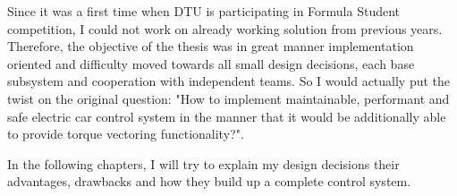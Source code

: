 Since it was a first time when DTU is participating in Formula Student competition, I could not work on already working solution from previous years.
Therefore, the objective of the thesis was in great manner implementation oriented and difficulty moved towards all small design decisions, each base subsystem and cooperation with independent teams. So I would actually put the twist on the original question: "How to implement maintainable, performant and safe electric car control system in the manner that it would be additionally able to provide torque vectoring functionality?".

In the following chapters, I will try to explain my design decisions their advantages, drawbacks and how they build up a complete control system.